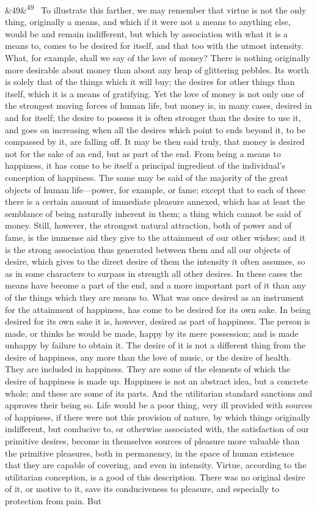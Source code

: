 \documentclass[12pt]{article}
\newcommand{\para}[1][]{\par\noindent\ifx&#1&\else\textsuperscript{\footnotesize #1}~\fi}
\begin{document}
\para[49] To illustrate this farther, we may remember that virtue is not the only thing, originally a means, and which if it were not a means to anything else, would be and remain indifferent, but which by association with what it is a means to, comes to be desired for itself, and that too with the utmost intensity. What, for example, shall we say of the love of money? There is nothing originally more desirable about money than about any heap of glittering pebbles. Its worth is solely that of the things which it will buy; the desires for other things than itself, which it is a means of gratifying. Yet the love of money is not only one of the strongest moving forces of human life, but money is, in many cases, desired in and for itself; the desire to possess it is often stronger than the desire to use it, and goes on increasing when all the desires which point to ends beyond it, to be compassed by it, are falling off. It may be then said truly, that money is desired not for the sake of an end, but as part of the end. From being a means to happiness, it has come to be itself a principal ingredient of the individual's conception of happiness. The same may be said of the majority of the great objects of human life---power, for example, or fame; except that to each of these there is a certain amount of immediate pleasure annexed, which has at least the semblance of being naturally inherent in them; a thing which cannot be said of money. Still, however, the strongest natural attraction, both of power and of fame, is the immense aid they give to the attainment of our other wishes; and it is the strong association thus generated between them and all our objects of desire, which gives to the direct desire of them the intensity it often assumes, so as in some characters to surpass in strength all other desires. In these cases the means have become a part of the end, and a more important part of it than any of the things which they are means to. What was once desired as an instrument for the attainment of happiness, has come to be desired for its own sake. In being desired for its own sake it is, however, desired as part of happiness. The person is made, or thinks he would be made, happy by its mere possession; and is made unhappy by failure to obtain it. The desire of it is not a different thing from the desire of happiness, any more than the love of music, or the desire of health. They are included in happiness. They are some of the elements of which the desire of happiness is made up. Happiness is not an abstract idea, but a concrete whole; and these are some of its parts. And the utilitarian standard sanctions and approves their being so. Life would be a poor thing, very ill provided with sources of happiness, if there were not this provision of nature, by which things originally indifferent, but conducive to, or otherwise associated with, the satisfaction of our primitive desires, become in themselves sources of pleasure more valuable than the primitive pleasures, both in permanency, in the space of human existence that they are capable of covering, and even in intensity. Virtue, according to the utilitarian conception, is a good of this description. There was no original desire of it, or motive to it, save its conduciveness to pleasure, and especially to protection from pain. But 
\end{document}
